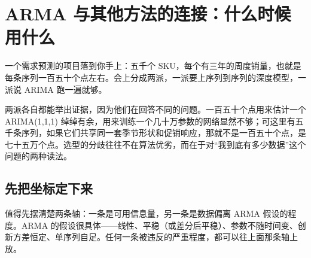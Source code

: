 \section{ARMA 与其他方法的连接：什么时候用什么}
\label{sec:06-Random-Processes/06-ARMA-and-ARIMA/04}

一个需求预测的项目落到你手上：五千个 SKU，每个有三年的周度销量，也就是每条序列一百五十个点左右。会上分成两派，一派要上序列到序列的深度模型，一派说 ARIMA 跑一遍就够。

两派各自都能举出证据，因为他们在回答不同的问题。一百五十个点用来估计一个 ARIMA(1,1,1) 绰绰有余，用来训练一个几十万参数的网络显然不够；可这里有五千条序列，如果它们共享同一套季节形状和促销响应，那就不是一百五十个点，是七十五万个点。选型的分歧往往不在算法优劣，而在于对``我到底有多少数据''这个问题的两种读法。

\subsection{先把坐标定下来}

值得先摆清楚两条轴：一条是可用信息量，另一条是数据偏离 ARMA 假设的程度。ARMA 的假设很具体——线性、平稳（或差分后平稳）、参数不随时间变、创新方差恒定、单序列自足。任何一条被违反的严重程度，都可以往上面那条轴上放。

